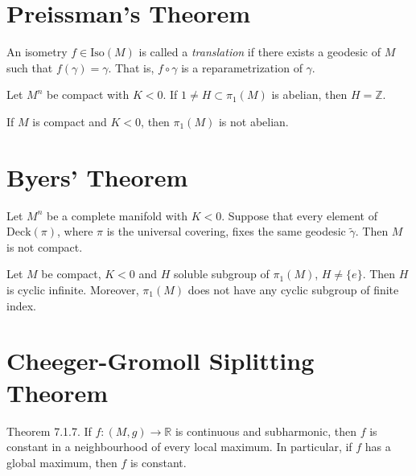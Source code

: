 \section{Preissman's Theorem}
\label{section-Preissman-theorem}

\begin{definition}
\label{definition-translation}
An isometry $f \in \text{Iso}(M)$ is called a {\it translation} if there exists
a geodesic of $M$ such that $f(\gamma)=\gamma$. That is, $f \circ \gamma$ is a
reparametrization of $\gamma$.
\end{definition}

\begin{theorem}[Preissman]
\label{theorem-Preissman}
Let $M^n$ be compact with $K<0$. If $1 \neq  H \subset \pi_1(M)$ is abelian,
then $H=\mathbb{Z}$.
\end{theorem}

\begin{theorem}[Preissman]
\label{theorem-M-compact-K-negative-then-pi1-not-abelian}
If $M$ is compact and $K<0$, then $\pi_{1}(M)$ is not abelian.
\end{theorem}

\section{Byers' Theorem}
\label{section-Byers-theorem}

\begin{lemma}
\label{lemma-deck-fixes-a-geodesic-then-not-compact}
Let $M^n$ be a complete manifold with $K<0$. Suppose that every element of
$\text{Deck}(\pi)$, where $\pi$ is the universal covering, fixes the same
 geodesic $\tilde{\gamma}$. Then $M$ is not compact.
\end{lemma}

\begin{theorem}[Byers]
\label{theorem-Byers}
Let $M$ be compact, $K<0$ and $H$ soluble subgroup of $\pi_1(M)$, $H\neq \{e\}$.
Then $H$ is cyclic infinite. Moreover, $\pi_1(M)$ does not have any cyclic
subgroup of finite index.
\end{theorem}

\section{Cheeger-Gromoll Siplitting Theorem}
\label{section-Chegger-Gromoll-splitting-theorem}

\begin{theorem}
\label{theorem-strong-maximum-principle}
\cite{pet} Theorem 7.1.7. If $f:(M,g) \to \mathbb{R}$ is continuous and
subharmonic, then $f$ is constant in a neighbourhood of every local maximum. In
particular, if $f$ has a global maximum, then $f$ is constant.
\end{theorem}

